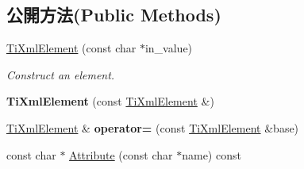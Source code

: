\subsection*{公開方法(Public Methods)}
\begin{DoxyCompactItemize}
\item 
\hyperlink{class_ti_xml_element_a01bc3ab372d35da08efcbbe65ad90c60}{Ti\+Xml\+Element} (const char $\ast$in\+\_\+value)\hypertarget{class_ti_xml_element_a01bc3ab372d35da08efcbbe65ad90c60}{}\label{class_ti_xml_element_a01bc3ab372d35da08efcbbe65ad90c60}

\begin{DoxyCompactList}\small\item\em Construct an element. \end{DoxyCompactList}\item 
{\bfseries Ti\+Xml\+Element} (const \hyperlink{class_ti_xml_element}{Ti\+Xml\+Element} \&)\hypertarget{class_ti_xml_element_a1ca4465f3c2eac6a60e641cd7f1d9f7e}{}\label{class_ti_xml_element_a1ca4465f3c2eac6a60e641cd7f1d9f7e}

\item 
\hyperlink{class_ti_xml_element}{Ti\+Xml\+Element} \& {\bfseries operator=} (const \hyperlink{class_ti_xml_element}{Ti\+Xml\+Element} \&base)\hypertarget{class_ti_xml_element_ad58d300f4cfc0016ffa6861ebb718a0b}{}\label{class_ti_xml_element_ad58d300f4cfc0016ffa6861ebb718a0b}

\item 
const char $\ast$ \hyperlink{class_ti_xml_element_ac1e4691e9375ba4e665dce7e46a50a9c}{Attribute} (const char $\ast$name) const \hypertarget{class_ti_xml_element_ac1e4691e9375ba4e665dce7e46a50a9c}{}\label{class_ti_xml_element_ac1e4691e9375ba4e665dce7e46a50a9c}


\end{DoxyCompactItemize}
